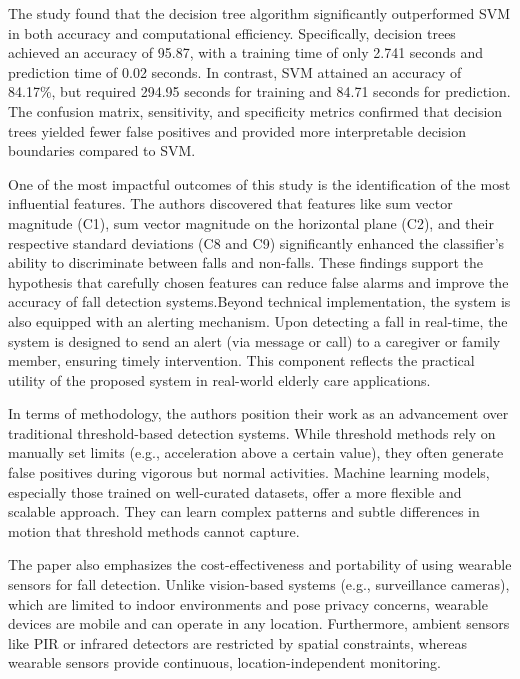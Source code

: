 \documentclass[a4paper, 12pt]{report}
\begin{document}
The study found that the decision tree algorithm significantly outperformed SVM in both accuracy and computational efficiency. Specifically, decision trees achieved an accuracy of 95.87, with a training time of only 2.741 seconds and prediction time of 0.02 seconds. In contrast, SVM attained an accuracy of 84.17\%, but required 294.95 seconds for training and 84.71 seconds for prediction. The confusion matrix, sensitivity, and specificity metrics confirmed that decision trees yielded fewer false positives and provided more interpretable decision boundaries compared to SVM.

One of the most impactful outcomes of this study is the identification of the most influential features. The authors discovered that features like sum vector magnitude (C1), sum vector magnitude on the horizontal plane (C2), and their respective standard deviations (C8 and C9) significantly enhanced the classifier's ability to discriminate between falls and non-falls. These findings support the hypothesis that carefully chosen features can reduce false alarms and improve the accuracy of fall detection systems.Beyond technical implementation, the system is also equipped with an alerting mechanism. Upon detecting a fall in real-time, the system is designed to send an alert (via message or call) to a caregiver or family member, ensuring timely intervention. This component reflects the practical utility of the proposed system in real-world elderly care applications.

In terms of methodology, the authors position their work as an advancement over traditional threshold-based detection systems. While threshold methods rely on manually set limits (e.g., acceleration above a certain value), they often generate false positives during vigorous but normal activities. Machine learning models, especially those trained on well-curated datasets, offer a more flexible and scalable approach. They can learn complex patterns and subtle differences in motion that threshold methods cannot capture.

The paper also emphasizes the cost-effectiveness and portability of using wearable sensors for fall detection. Unlike vision-based systems (e.g., surveillance cameras), which are limited to indoor environments and pose privacy concerns, wearable devices are mobile and can operate in any location. Furthermore, ambient sensors like PIR or infrared detectors are restricted by spatial constraints, whereas wearable sensors provide continuous, location-independent monitoring.
\end{document}
